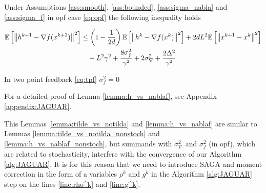     
        \begin{lemma}
        \label{lemma:h_vs_nablaf}
        Under Assumptions \ref{ass:smooth}, \ref{ass:bounded}, \ref{ass:sigma_nabla} and \ref{ass:sigma_f} in opf case \eqref{eq:opf} the following inequality holds
        
        \begin{equation}
        \label{eq:h_vs_nabla}
        \begin{split}
        \mathbb{E}\left[ \left\| h^{k+1} - \nabla f(x^{k+1}) \right\|^2 \right]
                &\leq
                \left(1 - \frac{1}{2 d}\right) \mathbb{E}\left[ \left\| h^{k} - \nabla f(x^{k}) \right\|^2 \right]
                + 2d L^2 \mathbb{E}\left[ \left\| x^{k+1} - x^{k} \right\|^2 \right]
                \\&\quad+ L^2 \gamma^2 
                + \frac{8 \sigma_f^2}{\gamma^2} 
                + 2 \sigma_{\nabla}^2 + \frac{2 \Delta^2}{\gamma^2}
        \end{split}
        \end{equation}
    
        In two point feedback \eqref{eq:tpf} $\sigma^2_f = 0$
        \end{lemma}
    
        For a detailed proof of Lemma \ref{lemma:h_vs_nablaf}, see Appendix \ref{appendix:JAGUAR}. 
    
        This Lemmas \ref{lemma:tilde_vs_notilda} and \ref{lemma:h_vs_nablaf} are similar to Lemmas \ref{lemma:tilde_vs_notilda_nonstoch} and \ref{lemma:h_vs_nablaf_nonstoch}, but summands with $\sigma^2_\nabla$ and $\sigma^2_f$ (in opf), which are related to stochasticity, interfere with the convergence of our Algorithm \ref{alg:JAGUAR}. It is for this reason that we need to introduce SAGA and moment correction in the form of a variables $\rho^k$ and $g^k$ in the Algorithm \ref{alg:JAGUAR} step on the lines \ref{line:rho^k} and \ref{line:g^k}. 
    
